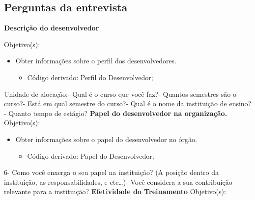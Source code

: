 \begin{apendicesenv}

\partapendices

\chapter{Perguntas da entrevista}

\begin{flushleft}
	\textbf{Descrição do desenvolvedor}
\end{flushleft}
Objetivo(s):
\begin{itemize}
	\item Obter informações sobre o perfil dos desenvolvedores.
	\begin{itemize}
		\item Código derivado: Perfil do Desenvolvedor;
	\end{itemize}
\end{itemize}
Unidade de alocação:\newline{}- Qual é o curso que você faz?- Quantos semestres são o curso?- Está em qual semestre do curso?- Qual é o nome da instituição de ensino?- Quanto tempo de estágio?\newline
\newline
\textbf{Papel do desenvolvedor na organização.}\newline\newline
Objetivo(s):
\begin{itemize}
	\item Obter informações sobre o papel do desenvolvedor no órgão.
	\begin{itemize}
		\item Código derivado: Papel do Desenvolvedor;
	\end{itemize}
\end{itemize}
6- Como você enxerga o seu papel na instituição? (A posição dentro da instituição, as responsabilidades, e etc…)- Você considera a sua contribuição relevante para a instituição?\newline
\newline
\textbf{Efetividade do Treinamento}\newline\newline
Objetivo(s):
\begin{itemize}

\end{itemize}
\end{apendicesenv}
